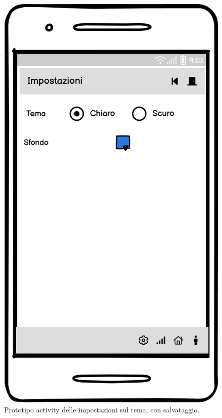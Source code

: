 \documentclass[a4paper,final,12pt]{report}
\begin{document}
\begin{figure}[hbtp]
\centering
\includegraphics[scale=0.28]{img_concettuale/Imp_tema_mob.png}
\caption{Prototipo activity delle impostazioni sul tema, con salvataggio.}
\end{figure}
\end{document}
